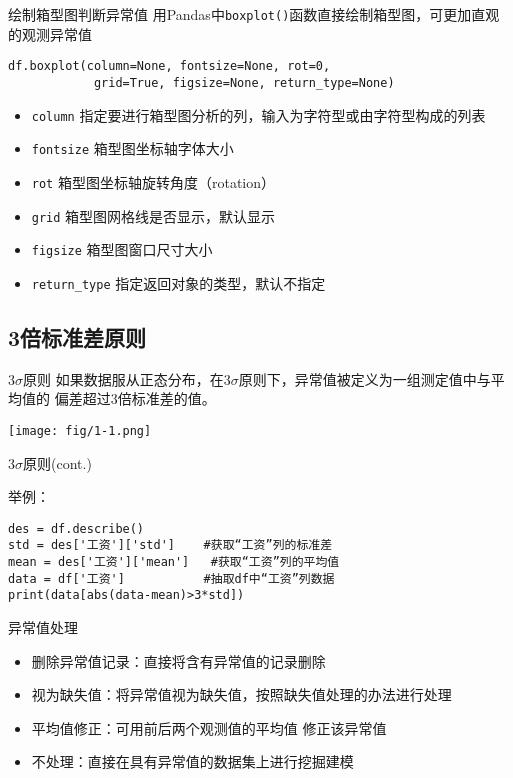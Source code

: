 \documentclass[t]{beamer}
\begin{document}
\begin{frame}[fragile]{绘制箱型图判断异常值}
    用Pandas中\verb|boxplot()|函数直接绘制箱型图，可更加直观的观测异常值
\begin{lstlisting}
df.boxplot(column=None, fontsize=None, rot=0, 
            grid=True, figsize=None, return_type=None)
\end{lstlisting}
\normalsize
\begin{itemize}
    \item \verb|column| 指定要进行箱型图分析的列，输入为字符型或由字符型构成的列表
    \item \verb|fontsize| 箱型图坐标轴字体大小
    \item \verb|rot| 箱型图坐标轴旋转角度（rotation）
    \item \verb|grid| 箱型图网格线是否显示，默认显示
    \item \verb|figsize| 箱型图窗口尺寸大小
    \item \verb|return_type| 指定返回对象的类型，默认不指定
\end{itemize}
\end{frame}    



    
\subsection{3倍标准差原则}


\begin{frame}[fragile]{$3\sigma$原则}
如果数据服从正态分布，在$3\sigma$原则下，异常值被定义为一组测定值中与平均值的
偏差超过3倍标准差的值。
\begin{center}
\texttt{[image: fig/1-1.png]}
\end{center}
\end{frame}


\begin{frame}[fragile]{$3\sigma$原则(cont.)}
    \begin{block}{举例：}
\begin{lstlisting}
des = df.describe()
std = des['工资']['std']    #获取“工资”列的标准差
mean = des['工资']['mean']   #获取“工资”列的平均值
data = df['工资']           #抽取df中“工资”列数据
print(data[abs(data-mean)>3*std])
\end{lstlisting}        
    \end{block}
\end{frame}

\begin{frame}[fragile]{异常值处理}
\begin{itemize}
    \item 删除异常值记录：直接将含有异常值的记录删除
    \item 视为缺失值：将异常值视为缺失值，按照缺失值处理的办法进行处理
    \item     平均值修正：可用前后两个观测值的平均值
    修正该异常值
    \item 不处理：直接在具有异常值的数据集上进行挖掘建模
\end{itemize}
\end{frame}
\end{document}
